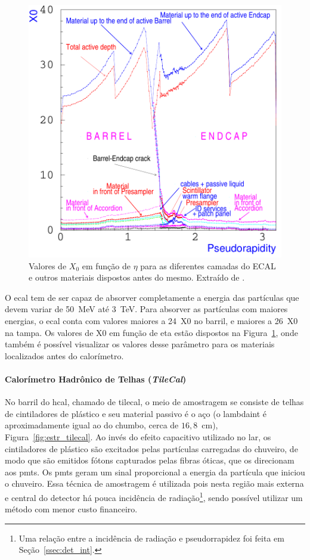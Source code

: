 \begin{figure}[h!t]
\centering
\includegraphics[width=.6\textwidth]{imagens/cal_em_x0.pdf}
\caption[Valores de $X_0$ em função de $\eta$ para as diferentes camadas do ECAL
e outros materiais dispostos antes do mesmo]{Valores de $X_0$ em função de $\eta$ para as diferentes camadas do ECAL
e outros materiais dispostos antes do mesmo. Extraído de \cite{cal_tdr}.}
\label{fig:cal_em_x0}
\end{figure}


O \gls{ecal} tem de ser capaz de absorver completamente a energia
das partículas que devem variar de 50~MeV até 3~TeV. 
Para absorver as partículas com maiores energias, o \gls{ecal} conta com valores
maiores a 24~\gls{X0} no barril, e maiores a 26~\gls{X0} na tampa. Os valores de \gls{X0} em 
função de \gls{eta} estão dispostos na Figura~\ref{fig:cal_em_x0}, onde também é possível
visualizar os valores desse parâmetro para os materiais localizados antes do
calorímetro.

\paragraph{Calorímetro Hadrônico de Telhas (\emph{TileCal})}
\label{par:cal_tilecal}

No barril do \gls{hcal}, chamado de \gls{tilecal}, o meio de amostragem se consiste de telhas de
cintiladores de plástico e seu material passivo é o aço (o \gls{lambdaint} é
aproximadamente igual ao do chumbo, cerca de $16,8$~cm), Figura~\ref{fig:estr_tilecal}. 
Ao invés do efeito capacitivo utilizado no \gls{lar}, os cintiladores de
plástico são excitados pelas partículas carregadas do chuveiro, de modo que são
emitidos fótons capturados pelas fibras óticas, que os direcionam aos
\glspl{pmt}. Os \glspl{pmt} geram um sinal proporcional a energia da partícula
que iniciou o chuveiro.
Essa técnica de amostragem é utilizada pois nesta região mais externa e central do detector 
há pouca incidência de radiação\footnote{Uma relação entre a incidência de
radiação e pseudorrapidez foi feita em Seção~\ref{ssec:det_int}.\label{fn:radiacao}}, 
sendo possível utilizar um método com menor custo financeiro.

